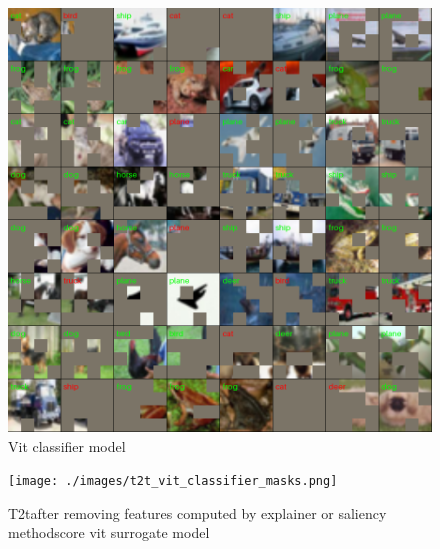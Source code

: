 \documentclass[magisterska,en]{pracamgr}
\begin{document}
\begin{figure}[H]
\centering
\includegraphics[scale=0.5]{./images/vit_classifier_masks.png}
\caption{Vit classifier model}
\label{vit_classifier_masks}
\end{figure}


\begin{figure}[H]
\centering
\texttt{[image: ./images/t2t\_vit\_classifier\_masks.png]}
\caption{T2t\textdel after removing features computed by explainer or saliency methodscore vit surrogate model}
\label{t2t_vit_classifier_masks}
\end{figure}
\end{document}
